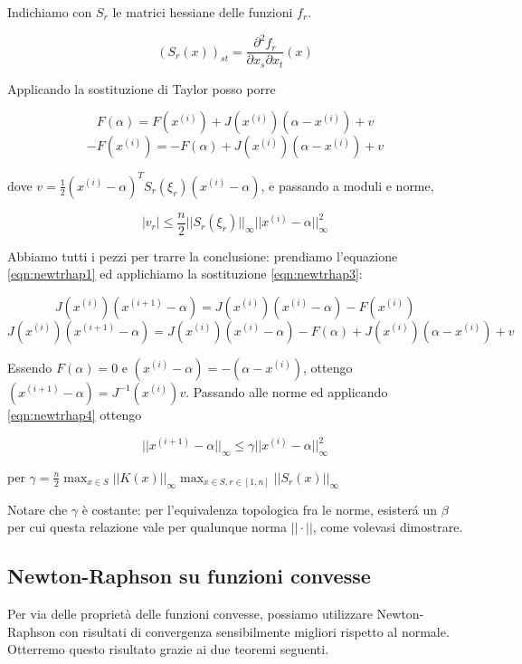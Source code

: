 \begin{thproof}
\begin{enumerate}[(a)]
Indichiamo con $ S_r $ le matrici hessiane delle funzioni $ f_r $.

\[ (S_r(x))_{st} = \dfrac{\partial^2 f_r}{\partial x_s \partial x_t} (x) \]

Applicando la sostituzione di Taylor posso porre

\[ F(\alpha) = F(x^{(i)}) + J(x^{(i)})(\alpha - x^{(i)}) + v \]
\begin{equation}
-F(x^{(i)}) = - F(\alpha) + J(x^{(i)})(\alpha - x^{(i)}) + v
\label{eqn:newtrhap3}\end{equation}

dove $ v = \frac{1}{2} (x^{(i)} - \alpha)^T S_r (\xi_r)(x^{(i)} -
\alpha) $, e passando a moduli e norme,

\begin{equation}
|v_r| \leq \frac{n}{2} || S_r(\xi_r) ||_{\infty} || x^{(i)}-\alpha
||_{\infty}^2
\label{eqn:newtrhap4}\end{equation}

Abbiamo tutti i pezzi per trarre la conclusione: prendiamo l'equazione
\ref{eqn:newtrhap1} ed applichiamo la sostituzione
\ref{eqn:newtrhap3}:

\[ J(x^{(i)}) (x^{(i+1)} - \alpha) = J(x^{(i)}) (x^{(i)} - \alpha) - F(x^{(i)}) \]
\[ J(x^{(i)}) (x^{(i+1)} - \alpha) = J(x^{(i)}) (x^{(i)} - \alpha) - F(\alpha) + J(x^{(i)})(\alpha - x^{(i)}) + v \]

Essendo $ F(\alpha) = 0 $ e $ (x^{(i)} - \alpha) = - (\alpha -
x^{(i)}) $, ottengo $ (x^{(i+1)} - \alpha) = J^{-1}(x^{(i)}) v
$. Passando alle norme ed applicando \ref{eqn:newtrhap4} ottengo

\[ ||x^{(i+1)} - \alpha ||_{\infty} \leq \gamma || x^{(i)} - \alpha ||_{\infty}^2 \]

per $ \gamma = \frac{n}{2} \max _{x \in S} || K(x) ||_{\infty} \max_{x
  \in S, r \in [1,n]} ||S_r(x)|| _{\infty} $

Notare che $ \gamma $ \`e costante: per l'equivalenza topologica fra
le norme, esister\'a un $ \beta $ per cui questa relazione vale per
qualunque norma $ || \cdot || $, come volevasi dimostrare.
\end{enumerate}
\end{thproof}




\subsection{Newton-Raphson su funzioni convesse}
Per via delle proprietà delle funzioni convesse, possiamo utilizzare Newton-Raphson con risultati di convergenza sensibilmente migliori rispetto al normale. Otterremo questo risultato grazie ai due teoremi seguenti.

